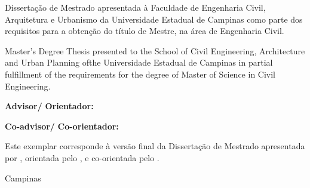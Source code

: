 \def\titlepage{
    \large\bf
    \vfill
    \begin{center}
        \@author
        \vfill
            \@title
            \vskip 8mm
        \titulo
    \end{center}
    \vfill
    \normalfont
    \normalsize
    \hfill\begin{minipage}[t]{0.54\textwidth}
        Disserta\c{c}\~{a}o de Mestrado apresentada \`{a} Faculdade de Engenharia Civil, Arquitetura e Urbanismo da Universidade Estadual de Campinas como parte dos requisitos para a obten\c{c}\~{a}o do t\'{i}tulo de Mestre, na área de Engenharia Civil.
    \end{minipage}
        \vskip 8mm
        \hfill\begin{minipage}[t]{0.54\textwidth}
            Master's Degree Thesis presented to the School of Civil Engineering, Architecture and Urban Planning ofthe Universidade Estadual de Campinas in partial fulfillment of the requirements for the degree of Master of Science in Civil Engineering.
        \end{minipage}
        \vskip 8mm
        \vfill
        {\bf Advisor/}\hspace{-0.9ex}
        {\bf Orientador: \advisor}

        {\bf Co-advisor/}\hspace{-0.7ex}
        {\bf Co-orientador: \coadvisor}
    \vfill
        \begin{minipage}[t]{0.5\textwidth}
            Este exemplar corresponde \`{a} vers\~{a}o final da Disserta\c{c}\~{a}o de Mestrado apresentada por \@author, orientada pelo \advisor \xspace, e co-orientada pelo \coadvisor.
        \end{minipage}
    \vfill
    \begin{center}
        \large
        Campinas\\ \workyear
    \end{center}
}

\titlepage